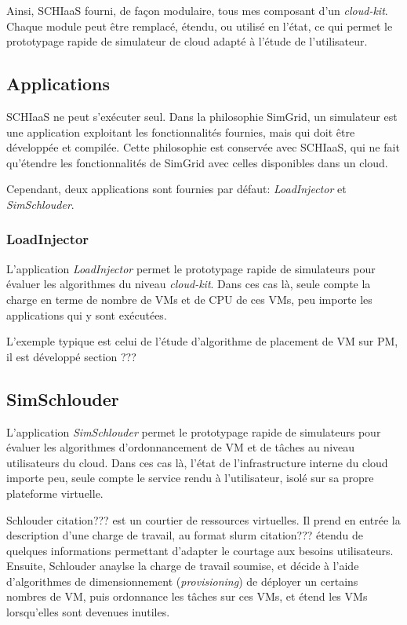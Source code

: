 \documentclass[parallelisme]{compas2017}
\begin{document}
Ainsi, SCHIaaS fourni, de façon modulaire, tous mes composant d'un \textit{cloud-kit}. 
Chaque module peut être remplacé, étendu, ou utilisé en l'état, ce qui permet le prototypage
rapide de simulateur de cloud adapté à l'étude de l'utilisateur.

\subsection{Applications}

SCHIaaS ne peut s'exécuter seul. Dans la philosophie SimGrid, un simulateur est une application
exploitant les fonctionnalités fournies, mais qui doit être développée et compilée.
Cette philosophie est conservée avec SCHIaaS, qui ne fait qu'étendre les fonctionnalités de 
SimGrid avec celles disponibles dans un cloud.

Cependant, deux applications sont fournies par défaut: \emph{LoadInjector} et \emph{SimSchlouder}.

\subsubsection{LoadInjector}

L'application \emph{LoadInjector} permet le prototypage rapide de simulateurs pour évaluer les 
algorithmes du niveau \textit{cloud-kit}. Dans ces cas là, seule compte la charge en terme de nombre 
de VMs et de CPU de ces VMs, peu importe les applications qui y sont exécutées.

L'exemple typique est celui de l'étude d'algorithme de placement de VM sur PM, il est développé section ???

\subsection{SimSchlouder}

L'application \emph{SimSchlouder} permet le prototypage rapide de simulateurs pour évaluer les 
algorithmes d'ordonnancement de VM et de tâches au niveau utilisateurs du cloud. 
Dans ces cas là, l'état de l'infrastructure interne du cloud importe peu, seule compte le service 
rendu à l'utilisateur, isolé sur sa propre plateforme virtuelle. 

Schlouder citation??? est un courtier de ressources virtuelles. Il prend en entrée la description 
d'une charge de travail, au format slurm citation??? étendu de quelques informations permettant 
d'adapter le courtage aux besoins utilisateurs. Ensuite, Schlouder anaylse la charge de travail 
soumise, et décide à l'aide d'algorithmes de dimensionnement (\textit{provisioning}) de déployer 
un certains nombres de VM, puis ordonnance les tâches sur ces VMs, et étend les VMs lorsqu'elles
sont devenues inutiles.
\end{document}

